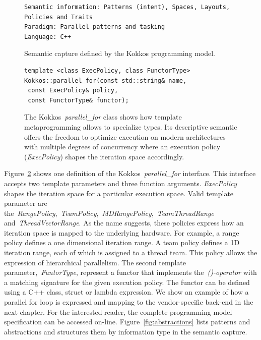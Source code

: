\begin{figure}[h]
\begin{Verbatim}[frame=leftline]
Semantic information: Patterns (intent), Spaces, Layouts, 
Policies and Traits
Paradigm: Parallel patterns and tasking
Language: C++
\end{Verbatim}
\caption{Semantic capture defined by the Kokkos programming model.}
\label{fig:SemCaptureKokkos}
\end{figure}

\begin{figure}
\begin{Verbatim}[frame=leftline]
template <class ExecPolicy, class FunctorType>
Kokkos::parallel_for(const std::string& name, 
 const ExecPolicy& policy, 
 const FunctorType& functor);
\end{Verbatim}
\caption{The Kokkos~\emph{parallel\_for} class shows how template metaprogramming allows to specialize types. Its descriptive semantic offers the freedom to optimize execution on modern architectures with multiple degrees of concurrency where an execution policy (\emph{ExecPolicy}) shapes the iteration space accordingly.}
\label{fig:parallelFor}
\end{figure}

Figure~\ref{fig:parallelFor} shows one definition of the Kokkos~\emph{parallel\_for} interface. This interface accepts two template parameters and three function arguments. \emph{ExecPolicy} shapes the iteration space for a particular execution space. Valid template parameter are the~\emph{RangePolicy},~\emph{TeamPolicy},~\emph{MDRangePolicy},~\emph{TeamThreadRange} and~\emph{ThreadVectorRange}. As the name suggests, these policies express how an iteration space is mapped to the underlying hardware. For example, a range policy defines a one dimensional iteration range. A team policy defines a 1D iteration range, each of which is assigned to a thread team. This policy allows the expression of hierarchical parallelism. The second template parameter,~\emph{FuntorType}, represent a functor that implements the~\emph{()-operator} with a matching signature for the given execution policy. The functor can be defined using a C++ class, struct or lambda expression. We show an example of how a parallel for loop is expressed and mapping to the vendor-specific back-end in the next chapter. For the interested reader, the complete programming model specification can be accessed on-line\cite{pub:KOKKOS}. Figure~\ref{fig:abstractions} lists patterns and abstractions and structures them by information type in the semantic capture.

